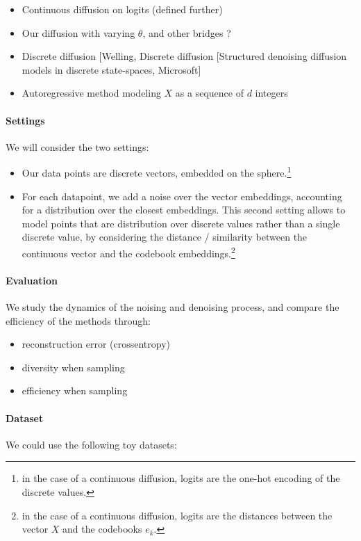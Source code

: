 \documentclass{article}
\begin{document}
\begin{itemize}
	\item Continuous diffusion on logits (defined further)
	\item Our diffusion with varying $\theta$, and other bridges ?
	\item Discrete diffusion [Welling, Discrete diffusion [Structured denoising diffusion models in discrete state-spaces, Microsoft]
	\item Autoregressive method modeling $X$ as a sequence of $d$ integers
\end{itemize}

\paragraph{Settings} We will consider the two settings:

\begin{itemize}
	\item Our data points are discrete vectors, embedded on the sphere.\footnote{in the case of a continuous diffusion, logits are the one-hot encoding of the discrete values.}
	\item For each datapoint, we add a noise over the vector embeddings, accounting for a distribution over the closest embeddings. This second setting allows to model points that are distribution over discrete values rather than a single discrete value, by considering the distance / similarity between the continuous vector and the codebook embeddings.\footnote{in the case of a continuous diffusion, logits are the distances between the vector $X$ and the codebooks $e_k$.}
\end{itemize}

\paragraph{Evaluation} We study the dynamics of the noising and denoising process, and compare the efficiency of the methods through:
\begin{itemize}
	\item reconstruction error (crossentropy)
	\item diversity when sampling
	\item efficiency when sampling
\end{itemize}

\paragraph{Dataset} We could use the following toy datasets:
\end{document}
